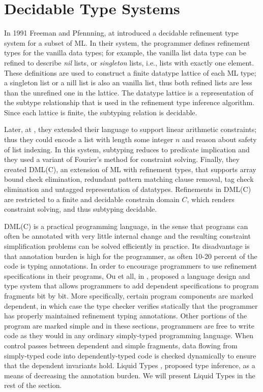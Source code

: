 	\newcommand\qset{\ensuremath{\mathbb{Q}}}
\newcommand\NV[1]{\columnbreak}


\section{Decidable Type Systems}\label{sec:liquid}
In 1991 Freeman and Pfennning, at \cite{FreemanPfenning91} introduced
a decidable refinement type system for a subset of ML.
%
In their system, the programmer defines refinement
types for the vanilla data types; 
for example, the vanilla 
list data type can be refined to 
describe \textit{nil} lists, or \textit{singleton} lists, i.e., lists
with exactly one element.
%
These definitions are used to 
construct a finite datatype lattice of each ML type;
a singleton list or a nill list is
also an vanilla list, thus both refined lists are 
less than the unrefined one in the lattice.
%
The datatype lattice is a representation of the subtype
relationship that is used in the 
refinement type inference algorithm. 
Since each lattice is finite, the 
subtyping relation is decidable.

Later, at \cite{pfenningxi98}, 
they extended their language to support
linear arithmetic constraints; thus they could
encode a list with length some integer $n$ and 
reason about safety of list indexing.
In this system, subtyping reduces to predicate implication
and they used a variant of Fourier's method \cite{OmegaTestCACM} 
for constraint solving.
%
Finally, they created DML(C)\cite{XiPfenning99}, 
an extension of ML with refinement types, that supports 
array bound check elimination,
redundant pattern matching clause removal, 
tag check elimination and untagged representation of datatypes.
%
Refinements in DML(C) are restricted to a finite and decidable
constrain domain $C$, 
which renders constraint solving, and thus subtyping decidable.
%

DML(C)  is a practical programming language, in the sense that 
programs can often be annotated with
very little internal change and the resulting
constraint simplification problems can be solved efficiently
in practice. 
%
Its disadvantage is that annotation burden is high for the programmer,  
as often 10-20 percent of
the code is typing annotations.
%
In order to encourage programmers to use refinement specifications in their programs,
Ou et all, in \cite{Ou2004}, proposed a language design and type system that allows programmers to add
dependent specifications to program fragments bit by bit. 
More specifically, certain program components are marked dependent, 
in which case the type checker verifies
statically that the programmer has properly maintained refinement typing annotations.
Other portions of the program are marked simple and in these sections, programmers
are free to write code as they would in any ordinary simply-typed programming language. When control passes between dependent and simple fragments, data flowing
from simply-typed code into dependently-typed code is checked dynamically to ensure that the dependent invariants hold.
Liquid Types \cite{LiquidPLDI08}, 
proposed type inference, as a means of decreasing the annotation burden.
We will present Liquid Types in the rest of the section.

